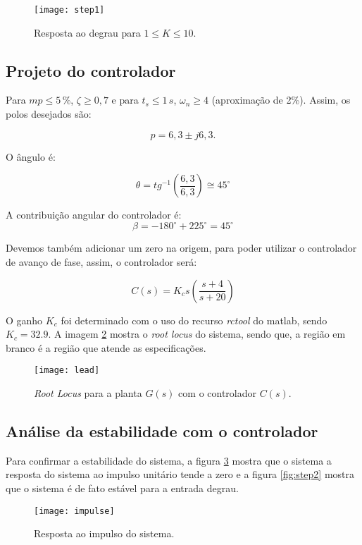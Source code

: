 \begin{figure}[H]
    \centering
    \caption{Resposta ao degrau para $ 1 \leq K \leq 10$.}
    \texttt{[image: step1]}
    \label{fig:step1}
\end{figure}

\subsection*{Projeto do controlador}

Para $mp \leq 5 \, \%$, $\zeta \geq 0,7$ e para $t_s \leq 1 \, s$, $\omega_n \geq 4$ (aproximação de 2\%). Assim, os polos desejados são:

\[
    p = 6,3 \pm j6,3.
\]

O ângulo é:

\[
    \theta = tg^{-1} \left( \frac{6,3}{6,3} \right) \cong 45^\circ
\]

A contribuição angular do controlador é:
\[
    \beta = -180^\circ + 225^\circ = 45^\circ
\]

Devemos também adicionar um zero na origem, para poder utilizar o controlador de avanço de fase, assim, o controlador será:

\[
    C(s) = K_c s \left( \frac{s+4}{s+20} \right)
\]

O ganho $K_c$ foi determinado com o uso do recurso \emph{rctool} do matlab, sendo $K_c = 32.9$. A imagem \ref{fig:lead} mostra o \textit{root locus} do sistema, sendo que, a região em branco é a região que atende as especificações.

\begin{figure}[H]
    \centering
    \caption{\textit{Root Locus} para a planta $G(s)$ com o controlador $C(s)$.}
    \texttt{[image: lead]}
    \label{fig:lead}
\end{figure}

\subsection*{Análise da estabilidade com o controlador}

Para confirmar a estabilidade do sistema, a figura \ref{fig:impulse} mostra que o sistema a resposta do sistema ao impulso unitário tende a zero e a figura \ref{fig:step2} mostra que o sistema é de fato estável para a entrada degrau.

\begin{figure}[H]
    \centering
    \caption{Resposta ao impulso do sistema.}
    \texttt{[image: impulse]}
    \label{fig:impulse}
\end{figure}

